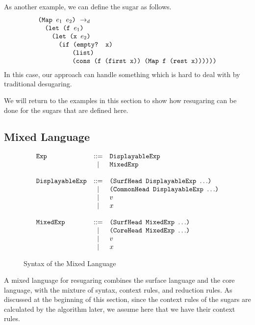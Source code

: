 As another example, we can define the  sugar as follows.
\[
\begin{array}{l}
\texttt{(Map $e_1$ $e_2$)} ~\rightarrow_d~\\
\quad\texttt{(let (f $e_1$)}\\
\qquad\texttt{(let (x $e_2$)}\\
\qquad\quad

\texttt{(if (empty? x)}\\
\qquad\qquad\quad\texttt{(list)}\\
\qquad\qquad\quad\texttt{(cons (f (first x)) (Map f (rest x))))))}
\end{array}
\]
In this case, our approach can handle something which is hard to deal with by traditional desugaring.

\medskip
We will return to the examples in this section to show how resugaring can be done for the  sugars that are defined here.



\subsection{Mixed Language}
\begin{figure}[t]
\begin{centering}
{\footnotesize
\[
			\begin{array}{lcl}
			\mbox{\tt Exp} &::=& \mbox{\tt DisplayableExp}\\
			&|& \mbox{\tt MixedExp}\\
			\\
			\mbox{\tt DisplayableExp} &::=& \mbox{\tt (SurfHead~DisplayableExp~$\ldots$)}\\
			&|& \mbox{\tt (CommonHead~DisplayableExp~$\ldots$)}\\
			&|& v\\
			&|& x\\
			\\
			\mbox{\tt MixedExp} &::=& \mbox{\tt (SurfHead~MixedExp~$\ldots$)}\\
			&|& \mbox{\tt (CoreHead~MixedExp~$\ldots$)}\\
			&|& v\\
			&|& x\\
			\end{array}
			\]
}

\end{centering}
\caption{Syntax of the Mixed Language}
\label{fig:mix}
\end{figure}

A mixed language for resugaring combines the surface language and the core language, with the mixture of syntax, context rules, and reduction rules. As discussed at the beginning of this section, since  the context rules of the sugars are calculated by the algorithm later, we assume here that we have their context rules.

